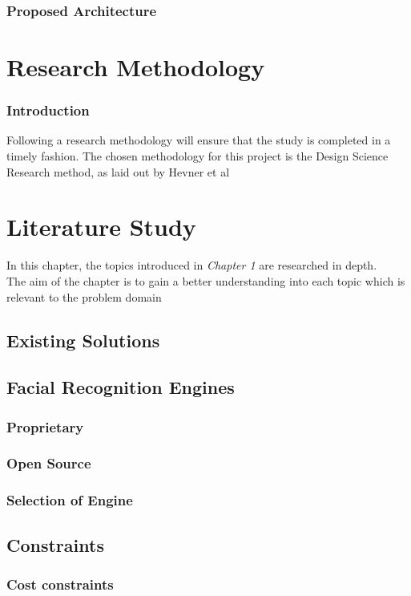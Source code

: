     \subsection{Proposed Architecture}
    \chapter{Research Methodology}
    \subsection{Introduction}
Following a research methodology will ensure that the study is completed in a timely fashion.  The chosen methodology for this project is the Design Science Research method, as laid out by Hevner et al
    \chapter{Literature Study}
In this chapter, the topics introduced in \textit{Chapter 1} are researched in depth. 
\\The aim of the chapter is to gain a better understanding into each topic which is relevant to the problem domain
    \section{Existing Solutions}
    \section{Facial Recognition Engines}
    \subsection{Proprietary}
    \subsection{Open Source}
    \subsection{Selection of Engine}
    \section{Constraints}
    \subsection{Cost constraints}
